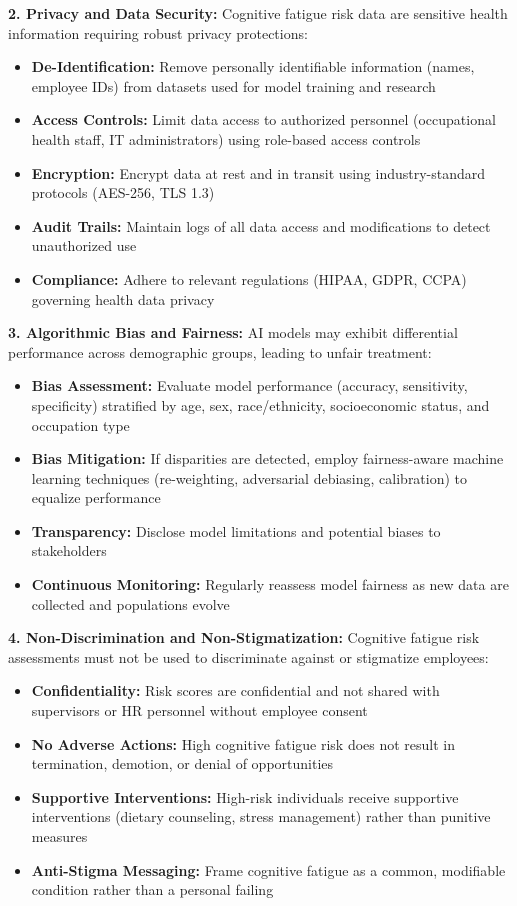 \documentclass[journal,twoside,10pt]{IEEEtran}
\begin{document}
\textbf{2. Privacy and Data Security:}
Cognitive fatigue risk data are sensitive health information requiring robust privacy protections:
\begin{itemize}
\item \textbf{De-Identification:} Remove personally identifiable information (names, employee IDs) from datasets used for model training and research
\item \textbf{Access Controls:} Limit data access to authorized personnel (occupational health staff, IT administrators) using role-based access controls
\item \textbf{Encryption:} Encrypt data at rest and in transit using industry-standard protocols (AES-256, TLS 1.3)
\item \textbf{Audit Trails:} Maintain logs of all data access and modifications to detect unauthorized use
\item \textbf{Compliance:} Adhere to relevant regulations (HIPAA, GDPR, CCPA) governing health data privacy
\end{itemize}

\textbf{3. Algorithmic Bias and Fairness:}
AI models may exhibit differential performance across demographic groups, leading to unfair treatment:
\begin{itemize}
\item \textbf{Bias Assessment:} Evaluate model performance (accuracy, sensitivity, specificity) stratified by age, sex, race/ethnicity, socioeconomic status, and occupation type
\item \textbf{Bias Mitigation:} If disparities are detected, employ fairness-aware machine learning techniques (re-weighting, adversarial debiasing, calibration) to equalize performance
\item \textbf{Transparency:} Disclose model limitations and potential biases to stakeholders
\item \textbf{Continuous Monitoring:} Regularly reassess model fairness as new data are collected and populations evolve
\end{itemize}

\textbf{4. Non-Discrimination and Non-Stigmatization:}
Cognitive fatigue risk assessments must not be used to discriminate against or stigmatize employees:
\begin{itemize}
\item \textbf{Confidentiality:} Risk scores are confidential and not shared with supervisors or HR personnel without employee consent
\item \textbf{No Adverse Actions:} High cognitive fatigue risk does not result in termination, demotion, or denial of opportunities
\item \textbf{Supportive Interventions:} High-risk individuals receive supportive interventions (dietary counseling, stress management) rather than punitive measures
\item \textbf{Anti-Stigma Messaging:} Frame cognitive fatigue as a common, modifiable condition rather than a personal failing
\end{itemize}
\end{document}
